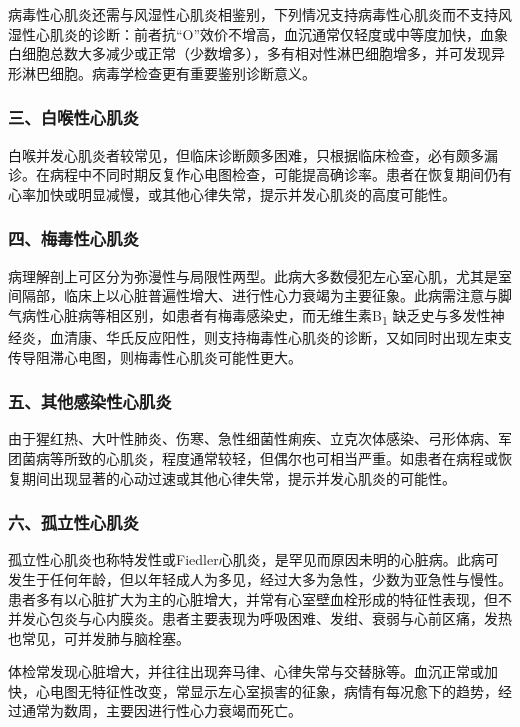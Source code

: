 病毒性心肌炎还需与风湿性心肌炎相鉴别，下列情况支持病毒性心肌炎而不支持风湿性心肌炎的诊断：前者抗“O”效价不增高，血沉通常仅轻度或中等度加快，血象白细胞总数大多减少或正常（少数增多），多有相对性淋巴细胞增多，并可发现异形淋巴细胞。病毒学检查更有重要鉴别诊断意义。

\subsubsection{三、白喉性心肌炎}

白喉并发心肌炎者较常见，但临床诊断颇多困难，只根据临床检查，必有颇多漏诊。在病程中不同时期反复作心电图检查，可能提高确诊率。患者在恢复期间仍有心率加快或明显减慢，或其他心律失常，提示并发心肌炎的高度可能性。

\subsubsection{四、梅毒性心肌炎}

病理解剖上可区分为弥漫性与局限性两型。此病大多数侵犯左心室心肌，尤其是室间隔部，临床上以心脏普遍性增大、进行性心力衰竭为主要征象。此病需注意与脚气病性心脏病等相区别，如患者有梅毒感染史，而无维生素B\textsubscript{1}
缺乏史与多发性神经炎，血清康、华氏反应阳性，则支持梅毒性心肌炎的诊断，又如同时出现左束支传导阻滞心电图，则梅毒性心肌炎可能性更大。

\subsubsection{五、其他感染性心肌炎}

由于猩红热、大叶性肺炎、伤寒、急性细菌性痢疾、立克次体感染、弓形体病、军团菌病等所致的心肌炎，程度通常较轻，但偶尔也可相当严重。如患者在病程或恢复期间出现显著的心动过速或其他心律失常，提示并发心肌炎的可能性。

\subsubsection{六、孤立性心肌炎}

孤立性心肌炎也称特发性或Fiedler心肌炎，是罕见而原因未明的心脏病。此病可发生于任何年龄，但以年轻成人为多见，经过大多为急性，少数为亚急性与慢性。患者多有以心脏扩大为主的心脏增大，并常有心室壁血栓形成的特征性表现，但不并发心包炎与心内膜炎。患者主要表现为呼吸困难、发绀、衰弱与心前区痛，发热也常见，可并发肺与脑栓塞。

体检常发现心脏增大，并往往出现奔马律、心律失常与交替脉等。血沉正常或加快，心电图无特征性改变，常显示左心室损害的征象，病情有每况愈下的趋势，经过通常为数周，主要因进行性心力衰竭而死亡。

